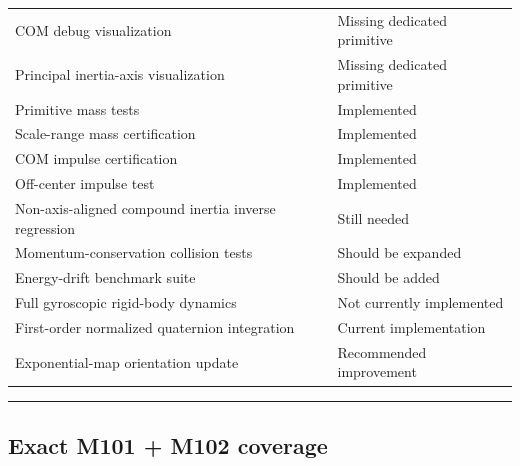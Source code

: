 {\begin{longtable}[]{@{}
  >{\raggedright\arraybackslash}p{}
  >{\raggedright\arraybackslash}p{}@{}}
COM debug visualization & Missing dedicated primitive \\
Principal inertia-axis visualization & Missing dedicated primitive \\
Primitive mass tests & Implemented \\
Scale-range mass certification & Implemented \\
COM impulse certification & Implemented \\
Off-center impulse test & Implemented \\
Non-axis-aligned compound inertia inverse regression & Still needed \\
Momentum-conservation collision tests & Should be expanded \\
Energy-drift benchmark suite & Should be added \\
Full gyroscopic rigid-body dynamics & Not currently implemented \\
First-order normalized quaternion integration & Current implementation \\
Exponential-map orientation update & Recommended improvement \\
\end{longtable}
}

\begin{center}\rule{0.5\linewidth}{0.5pt}\end{center}

\subsection{Exact M101 + M102 coverage}\label{06-engine-ii-ch039-exact-m101-m102-coverage}

\hypertarget{06-engine-ii-ch039-exact-m101-m102-coverage}{}

